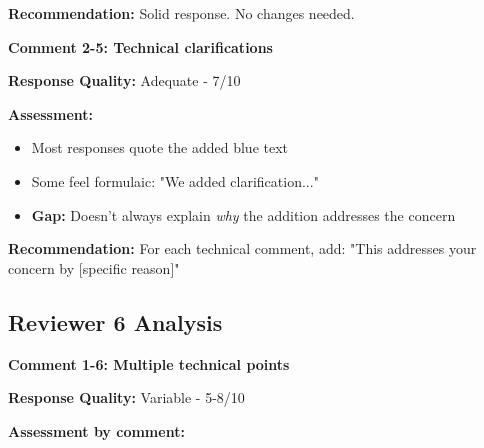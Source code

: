 \documentclass[11pt]{article}
\begin{document}
\textbf{Recommendation:} Solid response. No changes needed.

\vspace{0.3cm}

\textbf{Comment 2-5: Technical clarifications}

\textbf{Response Quality:} \textcolor{warning}{Adequate - 7/10}

\textbf{Assessment:}
\begin{itemize}[leftmargin=*]
\item Most responses quote the added blue text
\item Some feel formulaic: "We added clarification..."
\item \textbf{Gap:} Doesn't always explain \textit{why} the addition addresses the concern
\end{itemize}

\textbf{Recommendation:} For each technical comment, add: "This addresses your concern by [specific reason]"

\subsection{Reviewer 6 Analysis}

\textbf{Comment 1-6: Multiple technical points}

\textbf{Response Quality:} \textcolor{warning}{Variable - 5-8/10}

\textbf{Assessment by comment:}
\end{document}
